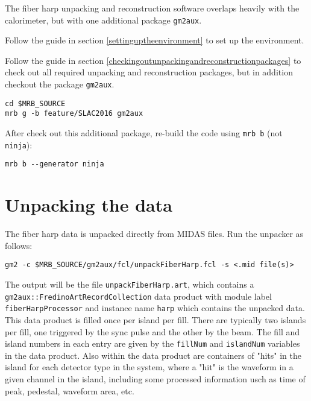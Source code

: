 The fiber harp unpacking and reconstruction software overlaps heavily with the calorimeter, but with one additional package \verb+gm2aux+.

\vspace{4mm}\par\noindent  Follow the guide in section \ref{settinguptheenvironment} to set up the environment.

\vspace{4mm}\par\noindent  Follow the guide in section \ref{checkingoutunpackingandreconstructionpackages} to check out all required unpacking and reconstruction packages, but in addition checkout the package \verb+gm2aux+.
%
\begin{Verbatim}[frame=single]
cd $MRB_SOURCE
mrb g -b feature/SLAC2016 gm2aux
\end{Verbatim}
%

\noindent After check out this additional package, re-build the code using \verb+mrb b+ (not \verb+ninja+):

%
\begin{Verbatim}[frame=single]
mrb b --generator ninja
\end{Verbatim}
%

\section{Unpacking the data}

The fiber harp data is unpacked directly from MIDAS files. Run the unpacker as follows:
%
\begin{Verbatim}[frame=single]
gm2 -c $MRB_SOURCE/gm2aux/fcl/unpackFiberHarp.fcl -s <.mid file(s)>
\end{Verbatim}
%

The output will be the file \verb+unpackFiberHarp.art+, which contains a \verb+gm2aux::FredinoArtRecordCollection+ data product with module label \verb+fiberHarpProcessor+ and instance name \verb+harp+ which contains the unpacked data. This data product is filled once per island per fill. There are typically two islands per fill, one triggered by the sync pulse and the other by the beam. The fill and island numbers in each entry are given by the \verb+fillNum+ and \verb+islandNum+ variables in the data product.
Also within the data product are containers of "hits" in the island for each detector type in the system, where a "hit" is the waveform in a given channel in the island, including some processed information usch as time of peak, pedestal, waveform area, etc.

